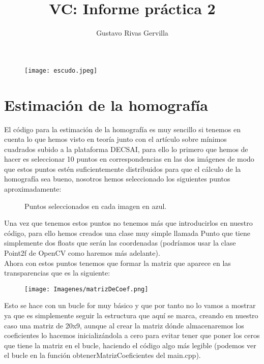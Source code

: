 \documentclass[10pt,a4paper]{article}
\author{Gustavo Rivas Gervilla}
\title{\textbf{VC: Informe práctica 2}}
\date{}
\begin{document}
\maketitle

\begin{figure}[H]
\centering
\texttt{[image: escudo.jpeg]}
\end{figure}

\newpage


\section{Estimación de la homografía}

El código para la estimación de la homografía es muy sencillo si tenemos en cuenta lo que hemos visto en teoría junto con el artículo sobre mínimos cuadrados subido a la plataforma DECSAI, para ello lo primero que hemos de hacer es seleccionar 10 puntos en correspondencias en las dos imágenes de modo que estos puntos estén suficientemente distribuidos para que el cálculo de la homografía sea bueno, nosotros hemos seleccionado los siguientes puntos aproximadamente:\\

\begin{figure}[H]
\centering
{}
\caption{Puntos seleccionados en cada imagen en azul.}
\end{figure}

Una vez que tenemos estos puntos no tenemos más que introducirlos en nuestro código, para ello hemos creados una clase muy simple llamada Punto que tiene simplemente dos floats que serán las coordenadas (podríamos usar la clase Point2f de OpenCV como haremos más adelante).\\

Ahora con estos puntos tenemos que formar la matriz que aparece en las transparencias que es la siguiente:\\

\begin{figure}[H]
\centering
\texttt{[image: Imagenes/matrizDeCoef.png]}
\end{figure}

Esto se hace con un bucle for muy básico y que por tanto no lo vamos a mostrar ya que es simplemente seguir la estructura que aquí se marca, creando en nuestro caso una matriz de 20x9, aunque al crear la matriz dónde almacenaremos los coeficientes lo hacemos inicializándola a cero para evitar tener que poner los ceros que tiene la matriz en el bucle, haciendo el código algo más legible (podemos ver el bucle en la función obtenerMatrizCoeficientes del main.cpp).\\
\end{document}
